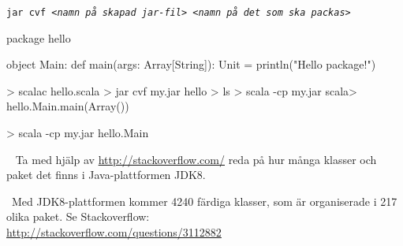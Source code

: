 \SubtaskSolved

\texttt{jar cvf \textit{<namn på skapad jar-fil> <namn på det som ska packas>}}

\SubtaskSolved
\begin{Code}
package hello

object Main:
  def main(args: Array[String]): Unit = println("Hello package!")
\end{Code}

\SubtaskSolved
\begin{REPL}
> scalac hello.scala
> jar cvf my.jar hello
> ls
> scala -cp my.jar
scala> hello.Main.main(Array())
\end{REPL}

\SubtaskSolved
\begin{REPL}
> scala -cp my.jar hello.Main
\end{REPL}

\QUESTEND





\QUESTBEGIN

\Task\Uberkurs \what~ Ta med hjälp av \url{http://stackoverflow.com/} reda på hur många klasser och paket det finns i Java-plattformen JDK8.

\SOLUTION

\TaskSolved \what~Med JDK8-plattformen kommer 4240 färdiga klasser, som är organiserade i 217 olika paket. Se Stackoverflow: \\\url{http://stackoverflow.com/questions/3112882}

\QUESTEND
